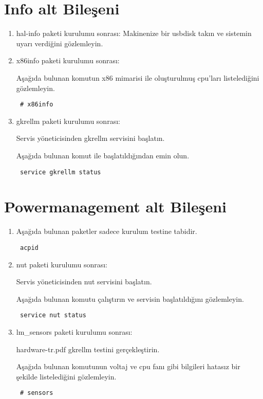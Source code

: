 \documentclass[a4paper,10pt]{article}
\begin{document}
\section{Info alt Bileşeni}
\begin{enumerate}
 \item  hal-info paketi kurulumu sonrası:
Makinenize bir usbdisk takın ve sistemin uyarı verdiğini gözlemleyin.

 \item  x86info paketi kurulumu sonrası:

Aşağıda bulunan komutun x86 mimarisi ile oluşturulmuş cpu'ları listelediğini gözlemleyin.
\begin{verbatim}
 # x86info
\end{verbatim}


 \item gkrellm paketi kurulumu sonrası:

Servis yöneticisinden gkrellm servisini başlatın.

Aşağıda bulunan komut ile başlatıldığından emin olun.
\begin{verbatim}
 service gkrellm status
\end{verbatim}

\end{enumerate}

\section{Powermanagement alt Bileşeni}
\begin{enumerate}
\item Aşağıda bulunan paketler sadece kurulum testine tabidir.
\begin{verbatim}
 acpid
\end{verbatim}
\item nut paketi kurulumu sonrası:

Servis yöneticisinden nut servisini başlatın.

Aşağıda bulunan komutu çalıştırın ve servisin başlatıldığını gözlemleyin. 
\begin{verbatim}
 service nut status
\end{verbatim}


 \item lm\_sensors paketi kurulumu sonrası:

hardware-tr.pdf gkrellm testini gerçekleştirin.

Aşağıda bulunan komutunun voltaj ve cpu fanı gibi bilgileri hatasız bir şekilde listelediğini gözlemleyin.
\begin{verbatim}
 # sensors 
\end{verbatim}

\end{enumerate}
\end{document}
